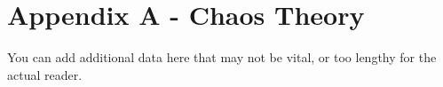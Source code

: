 \chapter{Appendix A - Chaos Theory}\label{app:chaos_intro}
You can add additional data here that may not be vital, or too lengthy for the actual reader.